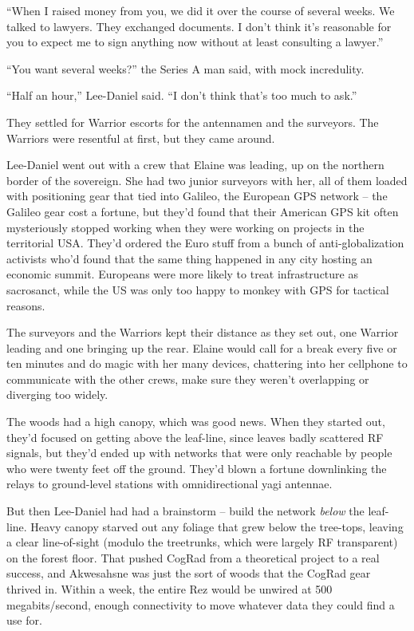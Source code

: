 “When I raised money from you, we did it over the course of several 
weeks. We talked to lawyers. They exchanged documents. I don't think 
it's reasonable for you to expect me to sign anything now without at 
least consulting a lawyer.”

“You want several weeks?” the Series A man said, with mock 
incredulity.

“Half an hour,” Lee-Daniel said. “I don't think that's too much 
to ask.”

\tb

They settled for Warrior escorts for the antennamen and the surveyors. 
The Warriors were resentful at first, but they came around.

Lee-Daniel went out with a crew that Elaine was leading, up on the 
northern border of the sovereign. She had two junior surveyors with 
her, all of them loaded with positioning gear that tied into Galileo, 
the European GPS network -- the Galileo gear cost a fortune, but they'd 
found that their American GPS kit often mysteriously stopped working 
when they were working on projects in the territorial USA. They'd 
ordered the Euro stuff from a bunch of anti-globalization activists 
who'd found that the same thing happened in any city hosting an 
economic summit. Europeans were more likely to treat infrastructure as 
sacrosanct, while the US was only too happy to monkey with GPS for 
tactical reasons.

The surveyors and the Warriors kept their distance as they set out, one 
Warrior leading and one bringing up the rear. Elaine would call for a 
break every five or ten minutes and do magic with her many devices, 
chattering into her cellphone to communicate with the other crews, make 
sure they weren't overlapping or diverging too widely.

The woods had a high canopy, which was good news. When they started 
out, they'd focused on getting above the leaf-line, since leaves badly 
scattered RF signals, but they'd ended up with networks that were only 
reachable by people who were twenty feet off the ground. They'd blown a 
fortune downlinking the relays to ground-level stations with 
omnidirectional yagi antennae.

But then Lee-Daniel had had a brainstorm -- build the network 
\emph{below} the leaf-line. Heavy canopy starved out any foliage that 
grew below the tree-tops, leaving a clear line-of-sight (modulo the 
treetrunks, which were largely RF transparent) on the forest floor. 
That pushed CogRad from a theoretical project to a real success, and 
Akwesahsne was just the sort of woods that the CogRad gear thrived in. 
Within a week, the entire Rez would be unwired at 500 megabits/second, 
enough connectivity to move whatever data they could find a use for.

